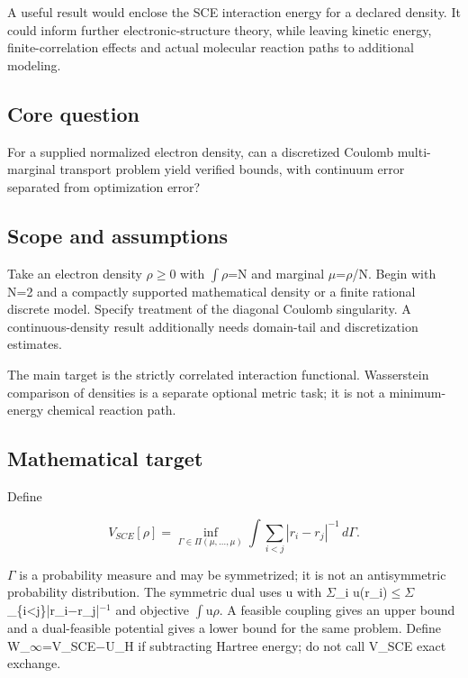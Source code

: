 \documentclass[
  11pt,
]{article}
\begin{document}
A useful result would enclose the SCE interaction energy for a declared
density. It could inform further electronic-structure theory, while
leaving kinetic energy, finite-correlation effects and actual molecular
reaction paths to additional modeling.

\subsection{Core question}

For a supplied normalized electron density, can a discretized Coulomb
multi-marginal transport problem yield verified bounds, with continuum
error separated from optimization error?

\subsection{Scope and assumptions}

Take an electron density \ensuremath{\rho}\ensuremath{\ge}0 with
\ensuremath{\int}\ensuremath{\rho}=N and marginal
\ensuremath{\mu}=\ensuremath{\rho}/N. Begin with N=2 and a compactly
supported mathematical density or a finite rational discrete model.
Specify treatment of the diagonal Coulomb singularity. A
continuous-density result additionally needs domain-tail and
discretization estimates.

The main target is the strictly correlated interaction functional.
Wasserstein comparison of densities is a separate optional metric task;
it is not a minimum-energy chemical reaction path.

\subsection{Mathematical target}

Define

\[V_{SCE}[\rho ]=\inf_{\Gamma \in\Pi(\mu ,\ldots,\mu )}\int\sum_{i<j}|r_i-r_j|^{-1}\,d\Gamma .\]

\ensuremath{\Gamma} is a probability measure and may be symmetrized; it
is not an antisymmetric probability distribution. The symmetric dual
uses u with \ensuremath{\Sigma}\_i
u(r\_i)\ensuremath{\le}\ensuremath{\Sigma}\_\{i<j\}|r\_i\ensuremath{-}r\_j|\ensuremath{{}^{-1}}
and objective \ensuremath{\int}u\ensuremath{\rho}. A feasible coupling
gives an upper bound and a dual-feasible potential gives a lower bound
for the same problem. Define
W\_\ensuremath{\infty}=V\_SCE\ensuremath{-}U\_H if subtracting Hartree
energy; do not call V\_SCE exact exchange.
\end{document}
